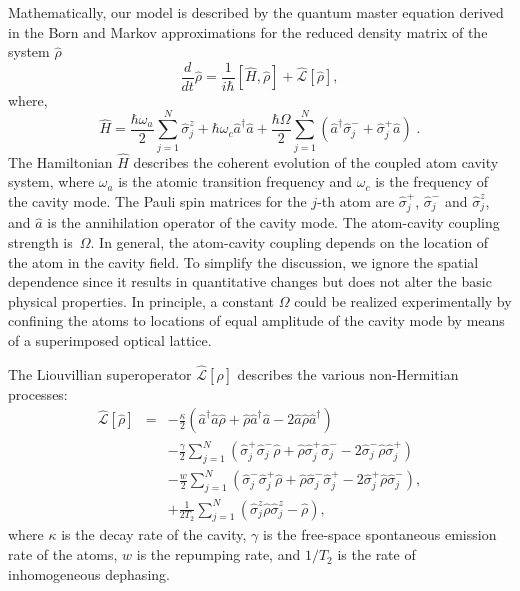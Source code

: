 \documentclass[aps,
twocolumn,
showpacs,
superscriptaddress,groupedaddress]{revtex4}
\begin{document}
Mathematically, our model is described by the quantum master equation
derived in the Born and Markov approximations for the reduced density
matrix of the system $\hat{\rho}$
\begin{equation}
  \frac{d}{dt} \hat{\rho} =
  \frac{1}{i \hbar} \left[ \hat{H}, \hat{\rho} \right] +
  \hat{\mathcal{L}}\left[ \hat{\rho} \right],
\label{ME1Crossover}
\end{equation}
where,
\begin{equation}
\hat{H} = \frac{\hbar \omega_a}{2} \sum_{j=1}^{N} \hat{\sigma}^{z}_{j}
+ \hbar \omega_c \hat{a}^{\dagger}\hat{a}
+ \frac{\hbar \Omega}{2}  \sum_{j=1}^{N} \left(
    \hat{a}^{\dagger} \hat{\sigma}^{-}_{j} +
    \hat{\sigma}^{+}_{j} \hat{a} \right)\;.
\end{equation}
The Hamiltonian $\hat{H}$ describes the coherent evolution of the
coupled atom cavity system, where $\omega_{a}$ is the atomic
transition frequency and $\omega_c$ is the frequency of the cavity
mode. The Pauli spin matrices for the $j$-th atom are
$\hat{\sigma}_j^{+}$, $\hat{\sigma}_j^{-}$ and $\hat{\sigma}_j^{z}$,
and $\hat{a}$ is the annihilation operator of the cavity mode. The
atom-cavity coupling strength is~$\Omega$.  In general, the
atom-cavity coupling depends on the location of the atom in the cavity
field.  To simplify the discussion, we ignore the spatial dependence
since it results in quantitative changes but does not alter the basic
physical properties.  In principle, a constant $\Omega$ could be
realized experimentally by confining the atoms to locations of equal
amplitude of the cavity mode by means of a superimposed optical
lattice.

The Liouvillian superoperator
$\hat{\mathcal{L}}\left[ \hat{\rho} \right]$ describes the various
non-Hermitian processes:
\begin{eqnarray}
\hat{\mathcal{L}}\left[ \hat{\rho} \right] &=&
  -\frac{\kappa}{2}
  \left(
    \hat{a}^{\dagger} \hat{a} \hat{\rho}
    + \hat{\rho}  \hat{a}^{\dagger} \hat{a}
    - 2\hat{a} \hat{\rho} \hat{a}^{\dagger}
  \right)
\nonumber
\\
 &&-\frac{\gamma}{2} \sum_{j=1}^N
  \left(
   \hat{\sigma}_{j}^{+} \hat{\sigma}_{j}^{-} \hat{\rho}
   + \hat{\rho} \hat{\sigma}_{j}^{+} \hat{\sigma}_{j}^{-}
   - 2\hat{\sigma}_{j}^{-} \hat{\rho} \hat{\sigma}_{j}^{+}
  \right)
\nonumber
\\
 &&-\frac{w}{2} \sum_{j=1}^N
  \left(
   \hat{\sigma}_{j}^{-} \hat{\sigma}_{j}^{+} \hat{\rho}
   + \hat{\rho} \hat{\sigma}_{j}^{-} \hat{\sigma}_{j}^{+}
   - 2\hat{\sigma}_{j}^{+} \hat{\rho}  \hat{\sigma}_{j}^{-}
  \right),
\nonumber
\\
 &&+\frac{1}{2T_2} \sum_{j=1}^N
  \left(
   \hat{\sigma}_{j}^{z} \hat{\rho}  \hat{\sigma}_{j}^{z} - \hat{\rho}
  \right),
\end{eqnarray}
where $\kappa$ is the decay rate of the cavity, $\gamma$ is the
free-space spontaneous emission rate of the atoms, $w$ is the
repumping rate, and $1/{T_2}$ is the rate of inhomogeneous dephasing.
\end{document}
